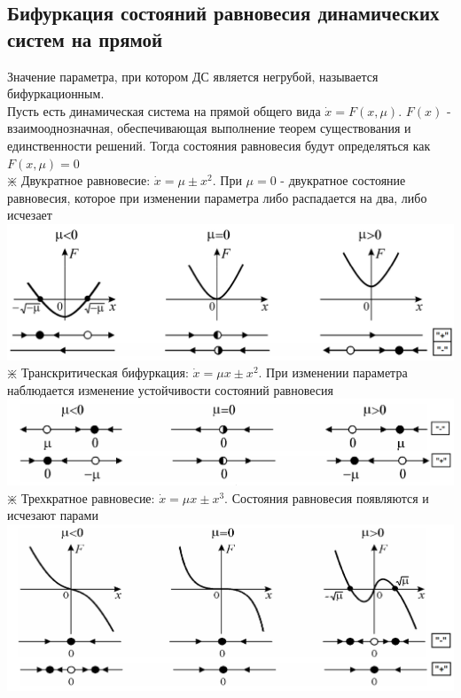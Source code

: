 \begin{multicols*}{2}
		\section{Бифуркация состояний равновесия динамических систем на прямой}
		Значение параметра, при котором ДС является негрубой, называется бифуркационным.\\
		Пусть есть динамическая система на прямой общего вида $\dot{x} = F(x, \mu)$. $F(x)$ - взаимооднозначная, обеспечивающая выполнение теорем существования и единственности решений. Тогда состояния равновесия будут определяться как $F(x, \mu) = 0$\\
		$\divideontimes$ Двукратное равновесие: $\dot{x} = \mu \pm x^2$. При $\mu = 0$ - двукратное состояние равновесия, которое при изменении параметра либо распадается на два, либо исчезает\\
		\includegraphics[width=0.75\linewidth]{tk_img/bifurk_1.png}\\
		$\divideontimes$ Транскритическая бифуркация: $\dot{x} = \mu x \pm x^2$. При изменении параметра наблюдается изменение устойчивости состояний равновесия\\
		\includegraphics[width=0.75\linewidth]{tk_img/bifurk_2.png}\\
		$\divideontimes$ Трехкратное равновесие: $\dot{x} = \mu x \pm x^3$. Состояния равновесия появляются и исчезают парами\\
		\includegraphics[width=0.75\linewidth]{tk_img/bifurk_3.png}
		

\end{multicols*}
